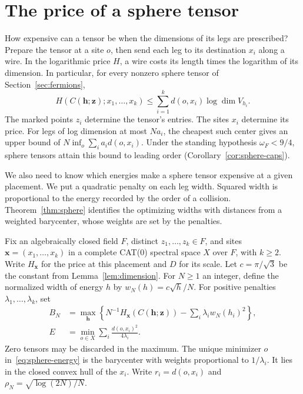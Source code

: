 \section{The price of a sphere tensor}\label{sec:sphere}

How expensive can a tensor be when the dimensions of its legs are
prescribed? Prepare the tensor at a site \(o\), then send each leg to its
destination \(x_i\) along a wire. In the logarithmic price \(H\), a wire
costs its length times the logarithm of its dimension. In particular,
for every nonzero sphere tensor of Section~\ref{sec:fermions},
\begin{equation}\label{eq:sphere-transport}
 H(C(\mathbf h;\mathbf z);x_1,\ldots,x_k)
 \le \sum_{i=1}^k d(o,x_i)\log\dim V_{h_i}.
\end{equation}
The marked points \(z_i\) determine the tensor's entries. The sites
\(x_i\) determine its price. For legs of log dimension at most \(Na_i\),
the cheapest such center gives an upper bound of
\(N\inf_o\sum_i a_i d(o,x_i)\). Under the standing hypothesis
\(\omega_F<9/4\), sphere tensors attain this bound to leading order
(Corollary~\ref{cor:sphere-caps}).

We also need to know which energies make a sphere tensor expensive
at a given placement. We put a quadratic penalty on each leg width.
Squared width is proportional to the energy recorded by the order of
a collision. Theorem~\ref{thm:sphere} identifies the
optimizing widths with distances from a weighted barycenter, whose
weights are set by the penalties.

Fix an algebraically closed field \(F\), distinct \(z_1,\ldots,z_k\in F\),
and sites \(\mathbf x=(x_1,\ldots,x_k)\) in a complete CAT(0) spectral
space \(X\) over \(F\), with \(k\ge2\). Write \(H_{\mathbf x}\) for the
price at this placement and \(D\) for its scale. Let \(c=\pi/\sqrt3\)
be the constant from Lemma~\ref{lem:dimension}. For \(N\ge1\) an integer,
define the normalized width of energy \(h\) by \(w_N(h)=c\sqrt h/N\).
For positive penalties \(\lambda_1,\ldots,\lambda_k\), set
\begin{align}
 B_N&=\max_{\mathbf h}
 \left\{N^{-1}H_{\mathbf x}(C(\mathbf h;\mathbf z))-
                      \sum_i\lambda_iw_N(h_i)^2\right\},
 \label{eq:sphere-objective}\\
 E&=\min_{o\in X}\sum_i\frac{d(o,x_i)^2}{4\lambda_i}.
 \label{eq:sphere-energy}
\end{align}
Zero tensors may be discarded in the maximum. The unique minimizer \(o\)
in~\eqref{eq:sphere-energy} is the barycenter with weights proportional
to \(1/\lambda_i\). It lies in the closed convex hull of the \(x_i\).
Write \(r_i=d(o,x_i)\) and \(\rho_N=\sqrt{\log(2N)/N}\).

